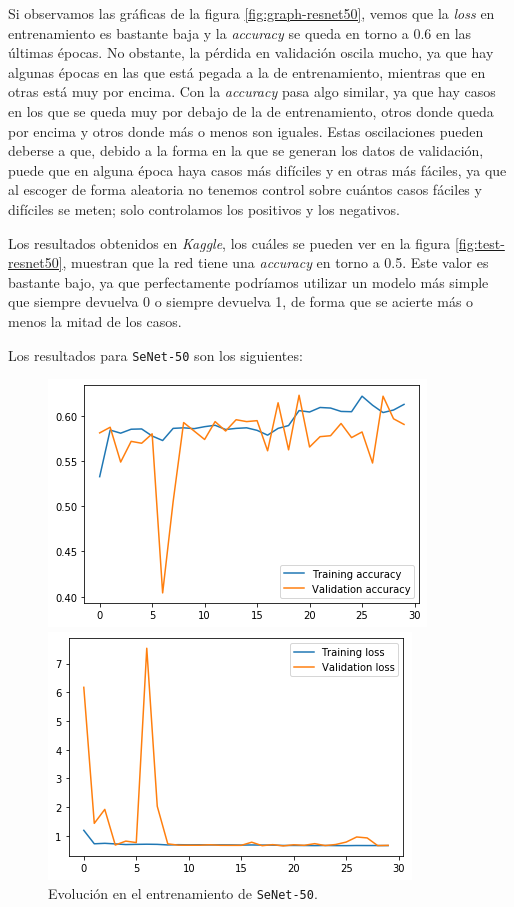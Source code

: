 \documentclass[11pt,a4paper]{article}
\begin{document}
Si observamos las gráficas de la figura \ref{fig:graph-resnet50}, vemos que la \textit{loss} en entrenamiento
es bastante baja y la \textit{accuracy} se queda en torno a 0.6 en las últimas épocas. No obstante, la
pérdida en validación oscila mucho, ya que hay algunas épocas en las que está pegada a la de entrenamiento,
mientras que en otras está muy por encima. Con la \textit{accuracy} pasa algo similar, ya que hay casos en los
que se queda muy por debajo de la de entrenamiento, otros donde queda por encima y otros donde más o menos son
iguales. Estas oscilaciones pueden deberse a que, debido a la forma en la que se generan los datos de validación,
puede que en alguna época haya casos más difíciles y en otras más fáciles, ya que al escoger de forma aleatoria
no tenemos control sobre cuántos casos fáciles y difíciles se meten; solo controlamos los positivos y los negativos.

Los resultados obtenidos en \textit{Kaggle}, los cuáles se pueden ver en la figura \ref{fig:test-resnet50},
muestran que la red tiene una \textit{accuracy} en torno a 0.5. Este valor es bastante bajo, ya que perfectamente
podríamos utilizar un modelo más simple que siempre devuelva 0 o siempre devuelva 1, de forma que se acierte más
o menos la mitad de los casos.

Los resultados para \texttt{SeNet-50} son los siguientes:

\begin{figure}[H]
\centering
\begin{minipage}{0.5\textwidth}
  \centering
  \includegraphics[scale=0.5]{img/accuracy-senet50.png}
\end{minipage}%
\begin{minipage}{0.5\textwidth}
  \centering
  \includegraphics[scale=0.5]{img/loss-senet50.png}
\end{minipage}
\caption{Evolución en el entrenamiento de \texttt{SeNet-50}.}
\label{fig:graph-senet50}
\end{figure}
\end{document}

